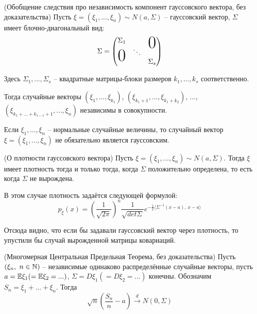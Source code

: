 \begin{corollary}  (Обобщение следствия про независимость компонент гауссовского вектора, без доказательства)
    Пусть $\xi = (\xi_1, ..., \xi_n) \sim N(a, \Sigma)$ -- гауссовский вектор, $\Sigma$ имеет блочно-диагональный вид:
    \[
        \Sigma = \begin{pmatrix}
            \Sigma_1 & & \bigzero \\
            \bigzero & \ddots & \\
             & & \Sigma_s
        \end{pmatrix}
    \]
    
    Здесь $\Sigma_1, ..., \Sigma_s$ -- квадратные матрицы-блоки размеров $k_1, ..., k_s$ соответственно.

    Тогда случайные векторы $(\xi_1, ..., \xi_{k_1})$, $(\xi_{k_1+1}, ..., \xi_{k_1+k_2})$, ..., $(\xi_{k_1 + ... + k_{s-1} +1}, ..., \xi_n)$ независимы в совокупности.
\end{corollary}

\begin{exercise}
    Если  $\xi_1, ..., \xi_n$ -- нормальные случайные величины, то случайный вектор $\xi = (\xi_1, ..., \xi_n)$ не обязательно является гауссовским.
\end{exercise}

\begin{exercise} (О плотности гауссовского вектора)
    Пусть $\xi = (\xi_1, ..., \xi_n) \sim N(a, \Sigma)$. Тогда $\xi$ имеет плотность тогда и только тогда, когда $\Sigma$ положительно определена, то есть когда $\Sigma$ не вырождена.

    В этом случае плотность задаётся следующей формулой:
    \[
        p_\xi(x) = \left( \frac{1}{\sqrt{2\pi}} \right)^n \frac{1}{\sqrt{det \Sigma}} e^{-\frac{1}{2} \langle \Sigma^{-1}(x-a),\ x-a \rangle}
    \]
\end{exercise}

\begin{note}
    Отсюда видно, что если бы задавали гауссовский вектор через плотность, то упустили бы случай вырожденной матрицы ковариаций.
\end{note}

\begin{theorem} (Многомерная Центральная Предельная Теорема, без доказательства)
    Пусть $(\xi_n,\ n \in \mathbb{N})$ -- независимые одинаково распределённые случайные векторы, пусть $a = \mathbb{E}\xi_1 (= \mathbb{E}\xi_2 = ...)$, $\Sigma = D\xi_1 (= D\xi_2 = ...)$ конечны. Обозначим $S_n = \xi_1 + ... + \xi_n$. Тогда
    \[
        \sqrt{n} \left( \frac{S_n}{n} - a \right) \xrightarrow{d} N(0, \Sigma)
    \]
\end{theorem}

